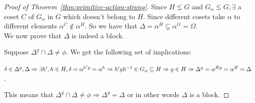 \begin{proof}[Proof of Theorem~\ref{thm:primitive-action-strong}]
Since $H \lneq G$ and $G_\alpha \lneq G, \exists$ a coset $C$ of $G_\alpha$ in $G$ which doesn't belong to $H$. Since different cosets take $\alpha$ to different elements $\alpha^C \notin \alpha^H$. So we have that $\Delta = \alpha^H \subsetneq \alpha^G = \Omega$. \\

We now prove that $\Delta$ is indeed a block. 

Suppose $\Delta^g \cap \Delta \neq \phi$. We get the following set of implications:

$\delta \in \Delta^g,\Delta \\
\Rightarrow \exists h',h \in H, \delta = \alpha^{h'g} = \alpha^h \\
\Rightarrow h'gh^{-1} \in G_\alpha \subseteq H \\
\Rightarrow g \in H \\
\Rightarrow \Delta^g = \alpha^{Hg} = \alpha^H = \Delta$. 

This means that $\Delta^g \cap \Delta \neq \phi \Rightarrow \Delta^g = \Delta$ or in other words $\Delta$ is a block.

\end{proof}





